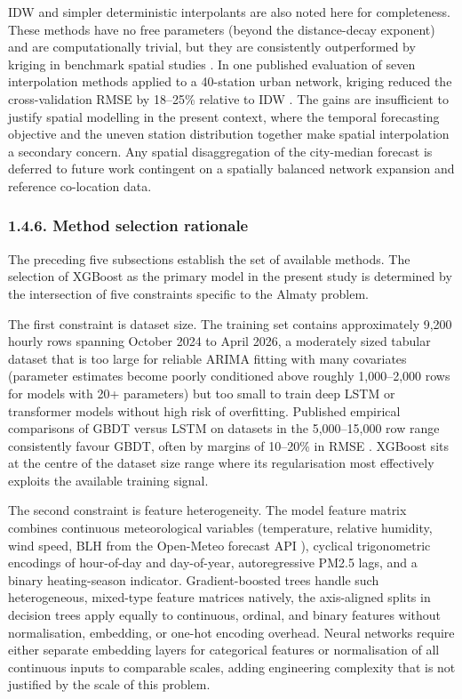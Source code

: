 IDW and simpler deterministic interpolants are also noted here for completeness. These methods have no free parameters (beyond the distance-decay exponent) and are computationally trivial, but they are consistently outperformed by kriging in benchmark spatial studies \cite{Wong2004Interpolation}. In one published evaluation of seven interpolation methods applied to a 40-station urban network, kriging reduced the cross-validation RMSE by 18--25\% relative to IDW \cite{Wong2004Interpolation}. The gains are insufficient to justify spatial modelling in the present context, where the temporal forecasting objective and the uneven station distribution together make spatial interpolation a secondary concern. Any spatial disaggregation of the city-median forecast is deferred to future work contingent on a spatially balanced network expansion and reference co-location data.

\subsubsection{1.4.6. Method selection rationale}\label{method-selection-rationale}

The preceding five subsections establish the set of available methods. The selection of XGBoost as the primary model in the present study is determined by the intersection of five constraints specific to the Almaty problem.

The first constraint is dataset size. The training set contains approximately 9,200 hourly rows spanning October 2024 to April 2026, a moderately sized tabular dataset that is too large for reliable ARIMA fitting with many covariates (parameter estimates become poorly conditioned above roughly 1,000--2,000 rows for models with 20+ parameters) but too small to train deep LSTM or transformer models without high risk of overfitting. Published empirical comparisons of GBDT versus LSTM on datasets in the 5,000--15,000 row range consistently favour GBDT, often by margins of 10--20\% in RMSE \cite{Ayus2023Comparison}. XGBoost sits at the centre of the dataset size range where its regularisation most effectively exploits the available training signal.

The second constraint is feature heterogeneity. The model feature matrix combines continuous meteorological variables (temperature, relative humidity, wind speed, BLH from the Open-Meteo forecast API \cite{zippenfenig_openmeteo_2023}), cyclical trigonometric encodings of hour-of-day and day-of-year, autoregressive PM2.5 lags, and a binary heating-season indicator. Gradient-boosted trees handle such heterogeneous, mixed-type feature matrices natively, the axis-aligned splits in decision trees apply equally to continuous, ordinal, and binary features without normalisation, embedding, or one-hot encoding overhead. Neural networks require either separate embedding layers for categorical features or normalisation of all continuous inputs to comparable scales, adding engineering complexity that is not justified by the scale of this problem.

